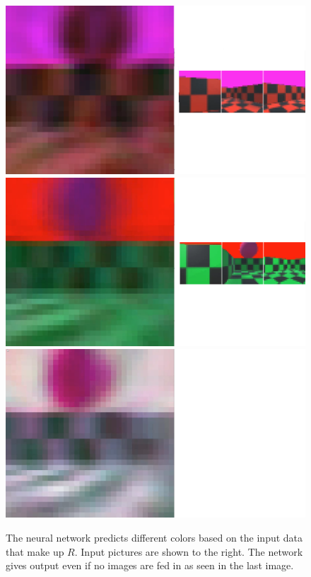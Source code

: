 \begin{figure}[p]
  \centering
  \includegraphics[height=\imgWithTripple]{images/workflow/FunctionalF1.png} \\[\picVdist]
  \includegraphics[height=\imgWithTripple]{images/workflow/FunctionalF2.png} \\[\picVdist]
  \includegraphics[height=\imgWithTripple]{images/workflow/FunctionalF3.png}
  \caption{The neural network predicts different colors based on the input data that make up $R$. Input pictures are shown to the right. The network gives output even if no images are fed in as seen in the last image.}
  \label{FunctionalFirstPerson}
\end{figure}

